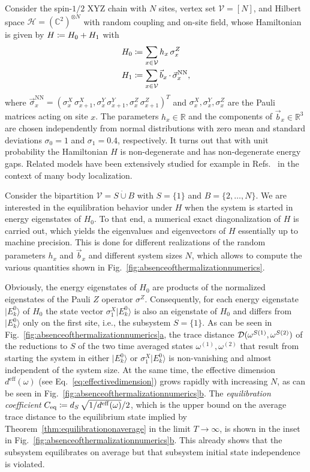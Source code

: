 \documentclass[a4paper,12pt,listof=totoc,index=totoc,bibliography=totoc,headsepline=false,headings=normal,BCOR16.153846mm,DIV12,headinclude,twoside,cleardoublepage=empty,numbers=noenddot,final]{scrreprt}
\newcommand{\refsub}[2]{\hyperref[#1]{\ref*{#1}#2}}
\theoremstyle{mystyle}
\numberwithin{equation}{section}
\numberwithin{figure}{section}
\numberwithin{lemma}{section}
\numberwithin{theorem}{section}
\numberwithin{corollary}{section}
\numberwithin{definition}{section}
\numberwithin{conjecture}{section}
\numberwithin{observation}{section}
\newcommand{\+}{\mkern2mu}
\newcommand{\coloneqq}{\mathrel{\vcentcolon\mkern-1.2mu=}} %
\newcommand{\dunion}{\mathbin{\dot{\cup}}}
\newcommand{\texteqref}[1]{Eq.~\eqref{#1}}
\newcommand{\argdot}{{\,\cdot\,}}
\renewcommand{\H}{H}
\newcommand{\Vset}{\mathcal{V}}
\newcommand{\ket}[1]{|#1\rangle}
\newcommand{\eqcoef}{C_{\mathrm{eq}}}
\newcommand{\deff}{d^{\mathrm{eff}}}
\newcommand{\tracedistance}[3][]{
  \ifthenelse{\equal{#2}{}}
  {\ifthenelse{\equal{#3}{}}
    {\mathcal{D}_{#1}}{}
  }{
    \ifthenelse{\equal{#1}{}}
    {\operatorname{\mathcal{D}}(#2,#3)}
    {\operatorname{\mathcal{D}}_{#1}(#2,#3)}
  }
}
\DeclareMathOperator{\1}{\mathds{1}}
\newcommand{\mc}[1]{\mathcal{#1}}
\newcommand{\mcH}{\mc{H}}
\newcommand{\mb}[1]{\mathbb{#1}}
\newcommand{\R}{\mb{R}}
\renewcommand{\C}{\mb{C}} %
\begin{document}
Consider the spin-$1/2$ XYZ chain with $N$ sites, vertex set $\Vset = [N]$, and Hilbert space $\mcH = (\C^2)^{\otimes N}$ with random coupling and on-site field, whose Hamiltonian is given by $\H \coloneqq \H_0 + \H_1$ with
\begin{align}
  \H_0 &\coloneqq \sum_{x\in\Vset} h_x\,\sigma^Z_x \\
  \H_1 &\coloneqq \sum_{x \in \Vset} \vec{b}_x \argdot \vec{\sigma}^{\mathrm{NN}}_x ,
\end{align}
where $\vec{\sigma}^{\mathrm{NN}}_x = (\sigma^X_x\,\sigma^X_{x+1},\sigma^Y_x\,\sigma^Y_{x+1},\sigma^Z_x\,\sigma^Z_{x+1})^T$ and $\sigma^X_x,\sigma^Y_x,\sigma^Z_x$ are the Pauli matrices acting on site $x$.
The parameters $h_x \in \R$ and the components of $\vec{b}_x \in \R^3$ are chosen independently from normal distributions with zero mean and standard deviations $\sigma_0=1$ and $\sigma_1=0.4$, respectively.
It turns out that with unit probability the Hamiltonian $\H$ is non-degenerate and has non-degenerate energy gaps.
Related models have been extensively studied for example in Refs.~\cite{PhysRevB.82.17,1006.1634v1} in the context of many body localization.

Consider the bipartition $\Vset = S \dunion B$ with $S = \{1\}$ and $B = \{2,\dots,N\}$.
We are interested in the equilibration behavior under $\H$ when the system is started in energy eigenstates of $\H_0$.
To that end, a numerical exact diagonalization of $\H$ is carried out, which yields the eigenvalues and eigenvectors of $\H$ essentially up to machine precision.
This is done for different realizations of the random parameters $h_x$ and $\vec{b}_x$ and different system sizes $N$, which allows to compute the various quantities shown in Fig.~\ref{fig:absenceofthermalizationnumerics}.

Obviously, the energy eigenstates of $\H_0$ are products of the normalized eigenstates of the Pauli $Z$ operator $\sigma^Z$.
Consequently, for each energy eigenstate $\ket{E_k^0}$ of $\H_0$ the state vector $\sigma^X_1 \ket{E_k^0}$ is also an eigenstate of $\H_0$ and differs from $\ket{E_k^0}$ only on the first site, i.e., the subsystem $S = \{1\}$.
As can be seen in Fig.~\refsub{fig:absenceofthermalizationnumerics}{a}, the trace distance $\tracedistance{\omega^{S(1)}}{\omega^{S(2)}}$ of the reductions to $S$ of the two time averaged states $\omega^{(1)},\omega^{(2)}$ that result from starting the system in either $\ket{E_k^0}$ or $\sigma^X_1 \ket{E_k^0}$ is non-vanishing and almost independent of the system size.
At the same time, the effective dimension $\deff(\omega)$ (see \texteqref{eq:effectivedimension}) grows rapidly with increasing $N$, as can be seen in Fig.~\refsub{fig:absenceofthermalizationnumerics}{b}.
The \emph{equilibration coefficient} $\eqcoef \coloneqq d_S\,\sqrt{1/\deff(\omega)}/2$, which is the upper bound on the average trace distance to the equilibrium state implied by Theorem~\ref{thm:equilibrationonaverage} in the limit $T\to\infty$, is shown in the inset in Fig.~\refsub{fig:absenceofthermalizationnumerics}{b}.
This already shows that the subsystem equilibrates on average but that subsystem initial state independence is violated.
\end{document}
